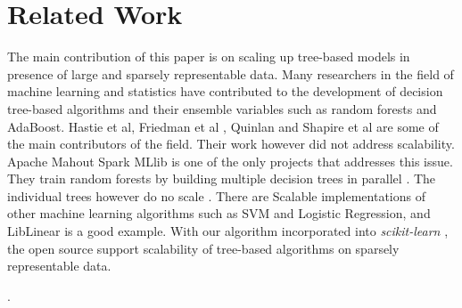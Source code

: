 \section{Related Work}
\label{sec:related}

The main contribution of this paper is on scaling up tree-based models in presence of large and sparsely representable data. Many researchers in the field of machine learning and statistics have contributed to the development of decision tree-based algorithms and their ensemble variables such as random forests and AdaBoost. Hastie et al\cite{hastie:book2008}, Friedman et al \cite{breiman1984classification}, Quinlan \cite{Quinlan:1993:CPM:152181} and Shapire et al \cite{Schapire99improvedboosting} are some of the main contributors of the field. Their work however did not address scalability. Apache Mahout Spark MLlib is one of the only projects that addresses this issue. They train random forests by building multiple decision trees in parallel \cite{das:blog2014}. The individual trees however do no scale \cite{Zaharia:2010:SCC:1863103.1863113}. There are Scalable implementations of other machine learning algorithms such as SVM and Logistic Regression, and LibLinear \cite{Chang:2011:LLS:1961189.1961199} is a good example. With our algorithm incorporated into \emph{scikit-learn} \cite{buitinck2013api}, the open source support scalability of tree-based algorithms on sparsely representable data. 

. 